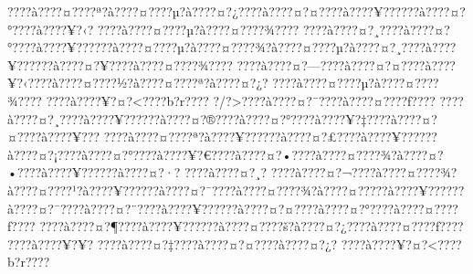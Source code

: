\documentclass[11pt, openany]{book}
\begin{document}
{{{{{{{{{{{{{{{{{{{{{{{{{{{{{{{{{{{{{{{{{{{{{{{{{{{{{{{{{{{{{{{{{{{{{{{{{{{{{{{{{{{{{{{{{{{{{{{{{{{{{{{{{{{{{???\textbar{}?à???\textbar{}?¤???\textbar{}?ª?à???\textbar{}?¤???\textbar{}?µ?à???\textbar{}?¤?¿???\textbar{}?à???\textbar{}?¤?¤???\textbar{}?à???\textbar{}?¥?????\textbar{}?à???\textbar{}?¤?°???\textbar{}?à???\textbar{}?¥?‹?
???\textbar{}?à???\textbar{}?¤???\textbar{}?µ?à???\textbar{}?¤???\textbar{}?¾???\textbar{}?
???\textbar{}?à???\textbar{}?¤?¸???\textbar{}?à???\textbar{}?¤?°???\textbar{}?à???\textbar{}?¥?????\textbar{}?à???\textbar{}?¤???\textbar{}?µ?à???\textbar{}?¤???\textbar{}?¾?à???\textbar{}?¤???\textbar{}?µ?à???\textbar{}?¤?¸???\textbar{}?à???\textbar{}?¥?????\textbar{}?à???\textbar{}?¤?¥???\textbar{}?à???\textbar{}?¤???\textbar{}?¾???\textbar{}?
???\textbar{}?à???\textbar{}?¤?---???\textbar{}?à???\textbar{}?¤?¤???\textbar{}?à???\textbar{}?¥?‹???\textbar{}?à???\textbar{}?¤???\textbar{}?½?à???\textbar{}?¤???\textbar{}?ª?à???\textbar{}?¤?¿?
???\textbar{}?à???\textbar{}?¤???\textbar{}?µ?à???\textbar{}?¤???\textbar{}?¾???\textbar{}?
???\textbar{}?à???\textbar{}?¥?¤?\textless{}???\textbar{}?b?r???\textbar{}?
?/?\textgreater{}???\textbar{}?à???\textbar{}?¤?¯???\textbar{}?à???\textbar{}?¤???\textbar{}?ƒ???\textbar{}?
???\textbar{}?à???\textbar{}?¤?¸???\textbar{}?à???\textbar{}?¥?????\textbar{}?à???\textbar{}?¤?®???\textbar{}?à???\textbar{}?¤?°???\textbar{}?à???\textbar{}?¥?‡???\textbar{}?à???\textbar{}?¤?¤???\textbar{}?à???\textbar{}?¥???
???\textbar{}?à???\textbar{}?¤???\textbar{}?ª?à???\textbar{}?¥?????\textbar{}?à???\textbar{}?¤?£???\textbar{}?à???\textbar{}?¥?????\textbar{}?à???\textbar{}?¤?¡???\textbar{}?à???\textbar{}?¤?°???\textbar{}?à???\textbar{}?¥?€???\textbar{}?à???\textbar{}?¤?•???\textbar{}?à???\textbar{}?¤???\textbar{}?¾?à???\textbar{}?¤?•???\textbar{}?à???\textbar{}?¥?????\textbar{}?à???\textbar{}?¤?·?
???\textbar{}?à???\textbar{}?¤?¸?
???\textbar{}?à???\textbar{}?¤?¬???\textbar{}?à???\textbar{}?¤???\textbar{}?¾?à???\textbar{}?¤???\textbar{}?¹?à???\textbar{}?¥?????\textbar{}?à???\textbar{}?¤?¯???\textbar{}?à???\textbar{}?¤???\textbar{}?¾?à???\textbar{}?¤?­???\textbar{}?à???\textbar{}?¥?????\textbar{}?à???\textbar{}?¤?¯???\textbar{}?à???\textbar{}?¤?¨???\textbar{}?à???\textbar{}?¥?????\textbar{}?à???\textbar{}?¤?¤???\textbar{}?à???\textbar{}?¤?°???\textbar{}?à???\textbar{}?¤???\textbar{}?ƒ???\textbar{}?
???\textbar{}?à???\textbar{}?¤?¶???\textbar{}?à???\textbar{}?¥?????\textbar{}?à???\textbar{}?¤???\textbar{}?š?à???\textbar{}?¤?¿???\textbar{}?à???\textbar{}?¤???\textbar{}?ƒ???\textbar{}?
???\textbar{}?à???\textbar{}?¥?¥?
???\textbar{}?à???\textbar{}?¤?‡???\textbar{}?à???\textbar{}?¤?¤???\textbar{}?à???\textbar{}?¤?¿?
???\textbar{}?à???\textbar{}?¥?¤?\textless{}???\textbar{}?b?r???\textbar{}?
}}}}}}}}}}}}}}}}}}}}}}}}}}}}}}}}}}}}}}}}}}}}}}}}}}}}}}}}}}}}}}}}}}}}}}}}}}}}}}}}}}}}}}}}}}}}}}}}}}}}}}}}}}}}}
\end{document}

